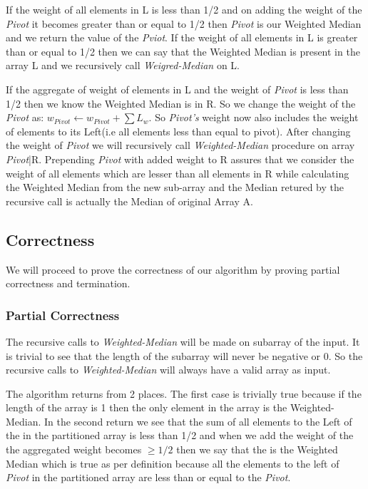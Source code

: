\documentclass[8pt]{article}
\begin{document}
If the weight of all elements in L is less than 1/2 and on adding the weight of the \textit{Pivot}
it becomes greater than or equal to 1/2 then \textit{Pivot} is our Weighted Median and
we return the value of the \textit{Pviot}. If the weight of all elements in L is greater
than or equal to 1/2 then we can say that the Weighted Median is present in the array L
and we recursively call \textit{Weigred-Median} on L.

If the aggregate of weight of elements in L and the weight of \textit{Pivot} is less than 1/2
then we know the Weighted Median is in R. So we change the weight of the
\textit{Pivot} as: $w_{Pivot} \leftarrow w_{Pivot} + \sum L_w$. So \textit{Pivot's} weight
now also includes the weight of elements to its Left(i.e all elements less than equal to pivot).
After changing the weight of \textit{Pivot} we will recursively call \textit{Weighted-Median}
procedure on array \textit{Pivot}|R. Prepending \textit{Pivot} with added weight to R
assures that we consider the weight of all elements which are lesser than all elements in R
while calculating the Weighted Median from the new sub-array and the Median retured by the
recursive call is actually the Median of original Array A.

\subsection{Correctness}
We will proceed to prove the correctness of our algorithm by proving partial correctness
and termination.

\subsubsection{Partial Correctness}
The recursive calls to \textit{Weighted-Median} will be made on subarray of the input.
It is trivial to see that the length of the subarray will never be negative or 0. So
the recursive calls to \textit{Weighted-Median} will always have a valid array as input.

The algorithm returns from 2 places. The first case is trivially true because if the length
of the array is 1 then the only element in the array is the Weighted-Median. In the second
return we see that the sum of all elements to the Left of the  in the partitioned
array is less than 1/2 and when we add the weight of the  the aggregated weight
becomes $\geq{1/2}$ then we say that the  is the Weighted Median which is true
as per definition because all the elements to the left of \textit{Pivot} in the partitioned
array are less than or equal to the \textit{Pivot}.
\end{document}
